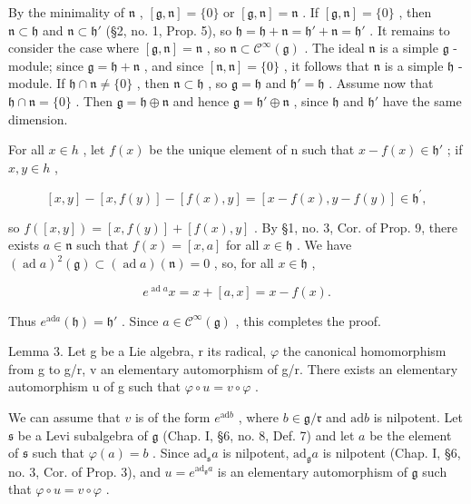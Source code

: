 By the minimality of \(\mathfrak{n}\) , \([\mathfrak{g},\mathfrak{n}] = \{0\}\) or \([\mathfrak{g},\mathfrak{n}] = \mathfrak{n}\) . If \([\mathfrak{g},\mathfrak{n}] = \{0\}\) , then \(\mathfrak{n} \subset \mathfrak{h}\) and \(\mathfrak{n} \subset \mathfrak{h}'\) (§2, no. 1, Prop. 5), so \(\mathfrak{h} = \mathfrak{h} + \mathfrak{n} = \mathfrak{h}' + \mathfrak{n} = \mathfrak{h}'\) . It remains to consider the case where \([\mathfrak{g},\mathfrak{n}] = \mathfrak{n}\) , so \(\mathfrak{n} \subset \mathcal{C}^{\infty}(\mathfrak{g})\) . The ideal \(\mathfrak{n}\) is a simple \(\mathfrak{g}\) -module; since \(\mathfrak{g} = \mathfrak{h} + \mathfrak{n}\) , and since \([\mathfrak{n},\mathfrak{n}] = \{0\}\) , it follows that \(\mathfrak{n}\) is a simple \(\mathfrak{h}\) -module. If \(\mathfrak{h} \cap \mathfrak{n} \neq \{0\}\) , then \(\mathfrak{n} \subset \mathfrak{h}\) , so \(\mathfrak{g} = \mathfrak{h}\) and \(\mathfrak{h}' = \mathfrak{h}\) . Assume now that \(\mathfrak{h} \cap \mathfrak{n} = \{0\}\) . Then \(\mathfrak{g} = \mathfrak{h} \oplus \mathfrak{n}\) and hence \(\mathfrak{g} = \mathfrak{h}' \oplus \mathfrak{n}\) , since \(\mathfrak{h}\) and \(\mathfrak{h}'\) have the same dimension.

For all \(x \in h\) , let \(f(x)\) be the unique element of n such that \(x - f(x) \in \mathfrak{h}'\) ; if \(x, y \in h\) ,

\[
[ x, y ] - [ x, f (y) ] - [ f (x), y ] = [ x - f (x), y - f (y) ] \in \mathfrak {h} ^ {\prime},
\]

so \(f([x,y]) = [x,f(y)] + [f(x),y]\) . By §1, no. 3, Cor. of Prop. 9, there exists \(a \in \mathfrak{n}\) such that \(f(x) = [x,a]\) for all \(x \in \mathfrak{h}\) . We have \((\operatorname{ad}a)^2(\mathfrak{g}) \subset (\operatorname{ad}a)(\mathfrak{n}) = 0\) , so, for all \(x \in \mathfrak{h}\) ,

\[
e ^ {\operatorname{ad} a} x = x + [ a, x ] = x - f (x).
\]

Thus \(e^{\mathrm{ad}a}(\mathfrak{h}) = \mathfrak{h}'\) . Since \(a \in \mathcal{C}^{\infty}(\mathfrak{g})\) , this completes the proof.

Lemma 3. Let g be a Lie algebra, r its radical, \(\varphi\) the canonical homomorphism from g to g/r, v an elementary automorphism of g/r. There exists an elementary automorphism u of g such that \(\varphi \circ u = v \circ \varphi\) .

We can assume that \(v\) is of the form \(e^{\mathrm{ad}b}\) , where \(b \in \mathfrak{g} / \mathfrak{r}\) and \(\mathrm{ad}b\) is nilpotent. Let \(\mathfrak{s}\) be a Levi subalgebra of \(\mathfrak{g}\) (Chap. I, §6, no. 8, Def. 7) and let \(a\) be the element of \(\mathfrak{s}\) such that \(\varphi(a) = b\) . Since \(\mathrm{ad}_{\mathfrak{s}}a\) is nilpotent, \(\mathrm{ad}_{\mathfrak{g}}a\) is nilpotent (Chap. I, §6, no. 3, Cor. of Prop. 3), and \(u = e^{\mathrm{ad}_{\mathfrak{g}}a}\) is an elementary automorphism of \(\mathfrak{g}\) such that \(\varphi \circ u = v \circ \varphi\) .

